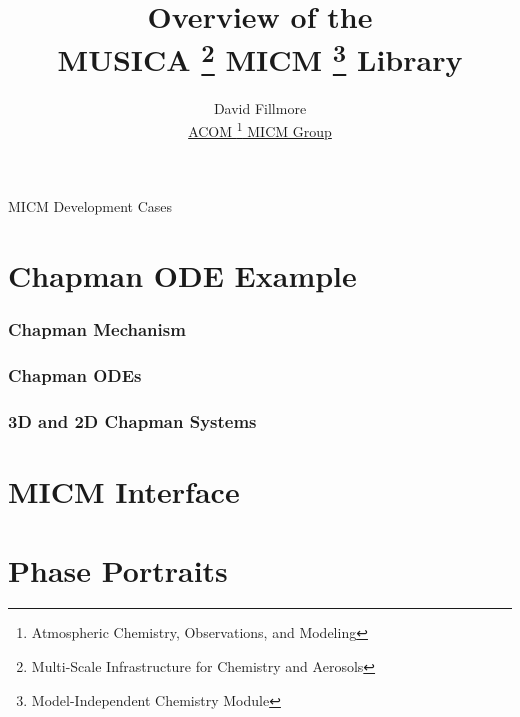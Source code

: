 \documentclass{beamer}
\title[MUSICA ODEs]{Overview of the \\
MUSICA
\footnote{Multi-Scale Infrastructure for Chemistry and Aerosols}
MICM
\footnote{Model-Independent Chemistry Module}
Library}
\author[Fillmore]{David Fillmore \\
\vspace{0.05in}
{\small \underline{ACOM
\footnote{Atmospheric Chemistry, Observations, and Modeling}
 MICM Group}}}
\begin{document}
\frame{\titlepage}

\begin{frame}
\begin{exampleblock}{MICM Development Cases}

\end{exampleblock}
\end{frame}

\section{Chapman ODE Example}

\begin{frame}
\frametitle{Chapman Mechanism}

\end{frame}

\begin{frame}
\frametitle{Chapman ODEs}

\end{frame}

\begin{frame}
\frametitle{3D and 2D Chapman Systems}

\end{frame}

\section{MICM Interface}
\begin{frame}

\end{frame}

\begin{frame}

\end{frame}

\begin{frame}

\end{frame}

\section{Phase Portraits}
\begin{frame}

\end{frame}

\begin{frame}

\end{frame}

\begin{frame}

\end{frame}
\end{document}
